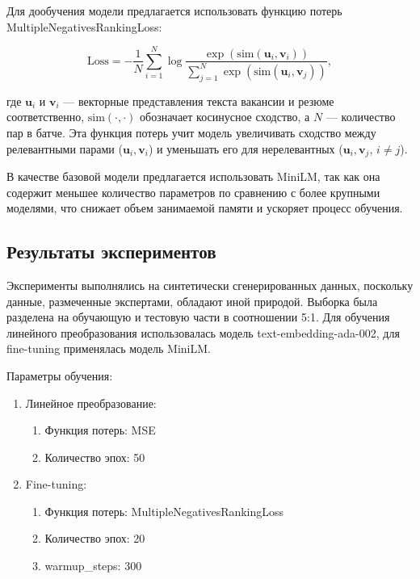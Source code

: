\documentclass{article}
\begin{document}
Для дообучения модели предлагается использовать функцию потерь MultipleNegativesRankingLoss: 

\[
\text{Loss} = - \frac{1}{N} \sum_{i=1}^{N} \log \frac{\exp(\text{sim}(\mathbf{u}_i, \mathbf{v}_i))}{\sum_{j=1}^{N} \exp(\text{sim}(\mathbf{u}_i, \mathbf{v}_j))},
\]

где \( \mathbf{u}_i \) и \( \mathbf{v}_i \) — векторные представления текста вакансии и резюме соответственно, \( \text{sim}(\cdot, \cdot) \) обозначает косинусное сходство, а \( N \) — количество пар в батче. Эта функция потерь учит модель увеличивать сходство между релевантными парами (\( \mathbf{u}_i, \mathbf{v}_i \)) и уменьшать его для нерелевантных (\( \mathbf{u}_i, \mathbf{v}_j \), \( i \neq j \)).

В качестве базовой модели предлагается использовать MiniLM, так как она содержит меньшее количество параметров по сравнению с более крупными моделями, что снижает объем занимаемой памяти и ускоряет процесс обучения.


\subsection{Результаты экспериментов}

Эксперименты выполнялись на синтетически сгенерированных данных, поскольку данные, размеченные экспертами, обладают иной природой. Выборка была разделена на обучающую и тестовую части в соотношении 5:1. Для обучения линейного преобразования использовалась модель text-embedding-ada-002, для fine-tuning применялась модель MiniLM.

Параметры обучения:
\begin{enumerate}
    \item Линейное преобразование: 
        \begin{enumerate}
            \item Функция потерь: MSE
            \item Количество эпох: 50
        \end{enumerate}
    \item Fine-tuning:
        \begin{enumerate}
            \item Функция потерь: MultipleNegativesRankingLoss
            \item Количество эпох: 20
            \item warmup\_steps: 300
        \end{enumerate}
\end{enumerate}
\end{document}
